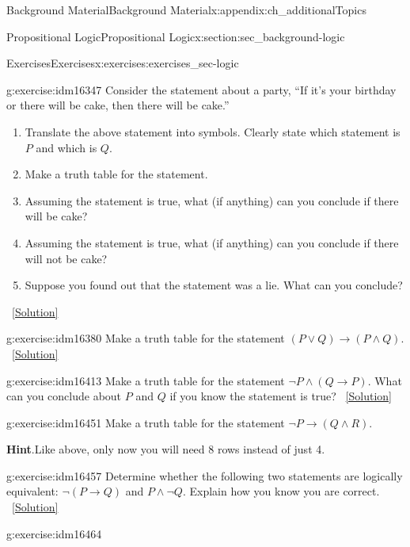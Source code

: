 \documentclass[oneside,10pt,]{book}
\numberwithin{equation}{chapter}
\def\imp{\rightarrow}
\begin{document}
\begin{appendixptx}{Background Material}{}{Background Material}{}{}{x:appendix:ch_additionalTopics}
\begin{sectionptx}{Propositional Logic}{}{Propositional Logic}{}{}{x:section:sec_background-logic}
\begin{exercises-subsection}{Exercises}{}{Exercises}{}{}{x:exercises:exercises_sec-logic}
\begin{divisionexercise}{1}{}{}{g:exercise:idm16347}
Consider the statement about a party, ``If it's your birthday or there will be cake, then there will be cake.''%
\par
%
\begin{enumerate}[label=(\alph*)]
\item{}Translate the above statement into symbols. Clearly state which statement is \(P\) and which is \(Q\).%
\item{}Make a truth table for the statement.%
\item{}Assuming the statement is true, what (if anything) can you conclude if there will be cake?%
\item{}Assuming the statement is true, what (if anything) can you conclude if there will not be cake?%
\item{}Suppose you found out that the statement was a lie. What can you conclude?%
\end{enumerate}
%
\qquad~\hfill{\tiny\hyperlink{g:solution:idm16365-main}{[Solution]}}\end{divisionexercise}%
\begin{divisionexercise}{2}{}{}{g:exercise:idm16380}%
Make a truth table for the statement \((P \vee Q) \imp (P \wedge Q)\).%
\qquad~\hfill{\tiny\hyperlink{g:solution:idm16384-main}{[Solution]}}\end{divisionexercise}%
\begin{divisionexercise}{3}{}{}{g:exercise:idm16413}%
Make a truth table for the statement \(\neg P \wedge (Q \imp P)\). What can you conclude about \(P\) and \(Q\) if you know the statement is true?%
\qquad~\hfill{\tiny\hyperlink{g:solution:idm16419-main}{[Solution]}}\end{divisionexercise}%
\begin{divisionexercise}{4}{}{}{g:exercise:idm16451}%
Make a truth table for the statement \(\neg P \imp (Q \wedge R)\).%
\par\smallskip%
\noindent\textbf{Hint}.\hypertarget{g:hint:idm16455}{}\quad{}Like above, only now you will need 8 rows instead of just 4.%
\end{divisionexercise}%
\begin{divisionexercise}{5}{}{}{g:exercise:idm16457}%
Determine whether the following two statements are logically equivalent:  \(\neg(P \imp Q)\) and \(P \wedge \neg Q\). Explain how you know you are correct.%
\qquad~\hfill{\tiny\hyperlink{g:solution:idm16462-main}{[Solution]}}\end{divisionexercise}%
\begin{divisionexercise}{6}{}{}{g:exercise:idm16464}%

\end{divisionexercise}
\end{exercises-subsection}
\end{sectionptx}
\end{appendixptx}
\end{document}
